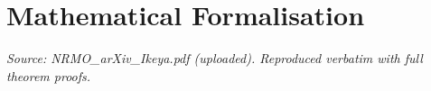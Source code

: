 \part{Mathematical Formalisation}
\noindent\textit{Source: NRMO\_arXiv\_Ikeya.pdf (uploaded). Reproduced
verbatim with full theorem proofs.}


